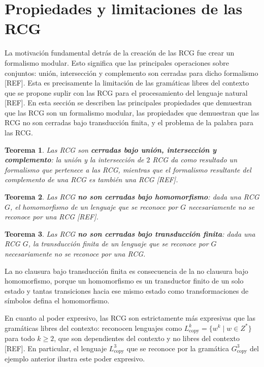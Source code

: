 \documentclass{report}
\theoremstyle{definition}
\theoremstyle{plain}
\newtheorem{teorema}{Teorema}[chapter]
\theoremstyle{remark}
\begin{document}
\section{Propiedades y limitaciones de las RCG}
\label{sec:propiedades-rcg}

La motivación fundamental detrás de la creación de las RCG fue crear un
formalismo modular. Esto significa que las principales operaciones sobre
conjuntos: unión, intersección y complemento son cerradas para dicho
formalismo [REF]. Esta es precisamente la limitación de
las gramáticas libres del contexto que se propone suplir con las RCG
para el procesamiento del lenguaje natural [REF]. En esta
sección se describen las principales propiedades que demuestran que las
RCG son un formalismo modular, las propiedades que demuestran que las
RCG no son cerradas bajo transducción finita, y el problema de la
palabra para las RCG.

\begin{teorema}
Las RCG son \textbf{cerradas bajo unión, intersección y complemento}:
la unión y la intersección de $2$ RCG da como resultado un formalismo
que pertenece a las RCG, mientras que el formalismo resultante del
complemento de una RCG es también una RCG [REF].
\end{teorema}

\begin{teorema}
Las RCG \textbf{no son cerradas bajo homomorfismo}: dada una RCG $G$, el
homomorfismo de un lenguaje que se reconoce por $G$ necesariamente no se
reconoce por una RCG [REF].
\end{teorema}

\begin{teorema}
Las RCG \textbf{no son cerradas bajo transducción finita}: dada una RCG
$G$, la transducción finita de un lenguaje que se reconoce por $G$
necesariamente no se reconoce por una RCG.
\end{teorema}

La no clausura bajo transducción finita es consecuencia de la no
clausura bajo homomorfismo, porque un homomorfismo es un transductor
finito de un solo estado y tantas transiciones hacia ese mismo estado
como transformaciones de símbolos defina el homomorfismo.

En cuanto al poder expresivo, las RCG son estrictamente más expresivas
que las gramáticas libres del contexto: reconocen lenguajes como
$L_{\mathrm{copy}}^k = \{ w^k \mid w \in Z^* \}$ para todo $k \ge 2$,
que son dependientes del contexto y no libres del contexto
[REF]. En particular, el lenguaje $L_{\mathrm{copy}}^3$ que
se reconoce por la gramática $G_{\mathrm{copy}}^3$ del ejemplo anterior
ilustra este poder expresivo.
\end{document}

